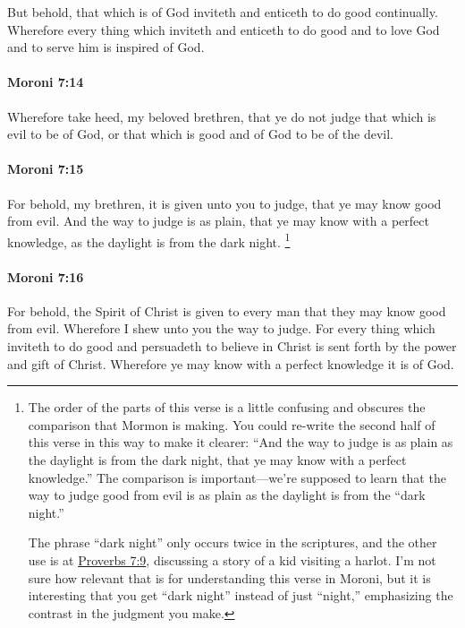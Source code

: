 			But behold, that which is of God inviteth and enticeth to do good continually.
			Wherefore every thing
			which inviteth and enticeth to do good
			and to love God and to serve him
			is inspired of God.

		\paragraph{Moroni 7:14} %
			\label{MORONI-7-14}

			Wherefore take heed, my beloved brethren,
			that ye do not judge that which is evil to be of God,
			or that which is good and of God to be of the devil.

		\paragraph{Moroni 7:15} %
			\label{MORONI-7-15}
			
			For behold, my brethren, it is given unto you to judge,
			that ye may know good from evil.
			And the way to judge is as plain,
			that ye may know with a perfect knowledge,
			as the daylight is from the dark night.%
				\footnote{%
					\label{MORONI-7-15-order}%
					The order of the parts of this verse is a little confusing and obscures the comparison that Mormon is making. You could re-write the second half of this verse in this way to make it clearer: ``And the way to judge is as plain as the daylight is from the dark night, that ye may know with a perfect knowledge.'' The comparison is important---we're supposed to learn that the way to judge good from evil is as plain as the daylight is from the ``dark night.''
					
					The phrase ``dark night'' only occurs twice in the scriptures, and the other use is at \hyperref[PROVERBS-7-9]{Proverbs 7:9}, discussing a story of a kid visiting a harlot. I'm not sure how relevant that is for understanding this verse in Moroni, but it is interesting that you get ``dark night'' instead of just ``night,'' emphasizing the contrast in the judgment you make.
					}
			
		\paragraph{Moroni 7:16} %
			\label{MORONI-7-16}
			
			For behold, the Spirit of Christ is given to every man
			that they may know good from evil.
			Wherefore I shew unto you the way to judge.
			For every thing which inviteth to do good and persuadeth to believe in Christ
			is sent forth by the power and gift of Christ.
			Wherefore ye may know with a perfect knowledge it is of God.
			
